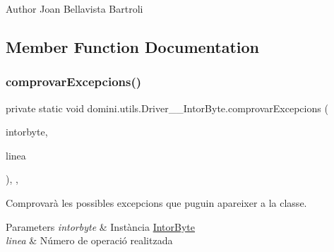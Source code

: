 \begin{DoxyAuthor}{Author}
Joan Bellavista Bartroli 
\end{DoxyAuthor}


\subsection{Member Function Documentation}
\mbox{\label{classdomini_1_1utils_1_1Driver____IntorByte_a3cb28e1e1b318e0b8e4809ebd171c8b2}} 
\subsubsection{\texorpdfstring{comprovar\+Excepcions()}{comprovarExcepcions()}}
{\footnotesize\ttfamily private static void domini.\+utils.\+Driver\+\_\+\+\_\+\+Intor\+Byte.\+comprovar\+Excepcions (\begin{DoxyParamCaption}\item[{\hyperlink{classdomini_1_1utils_1_1IntorByte}{Intor\+Byte}}]{intorbyte,  }\item[{String}]{linea }\end{DoxyParamCaption})\hspace{0.3cm}{\ttfamily [inline]}, {\ttfamily [static]}, {\ttfamily [private]}}



Comprovarà les possibles excepcions que puguin apareixer a la classe. 


\begin{DoxyParams}{Parameters}
{\em intorbyte} & Instància \hyperlink{classdomini_1_1utils_1_1IntorByte}{Intor\+Byte} \\
\hline
{\em linea} & Número de operació realitzada \\
\hline
\end{DoxyParams}
\mbox{\label{classdomini_1_1utils_1_1Driver____IntorByte_a82ac3bdc9baf9f3fa1b8984733d03240}} 
